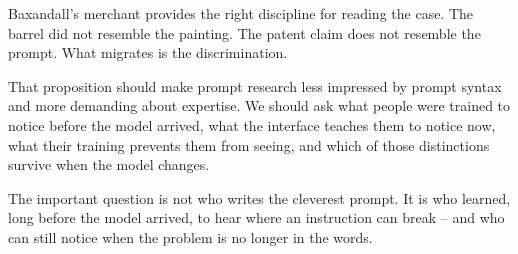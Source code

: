 \documentclass[11pt]{article}
\begin{document}
Baxandall's merchant provides the right discipline for reading the case. The barrel did not resemble the painting. The patent claim does not resemble the prompt. What migrates is the discrimination.

That proposition should make prompt research less impressed by prompt syntax and more demanding about expertise. We should ask what people were trained to notice before the model arrived, what the interface teaches them to notice now, what their training prevents them from seeing, and which of those distinctions survive when the model changes.

The important question is not who writes the cleverest prompt. It is who learned, long before the model arrived, to hear where an instruction can break -- and who can still notice when the problem is no longer in the words.
\end{document}
